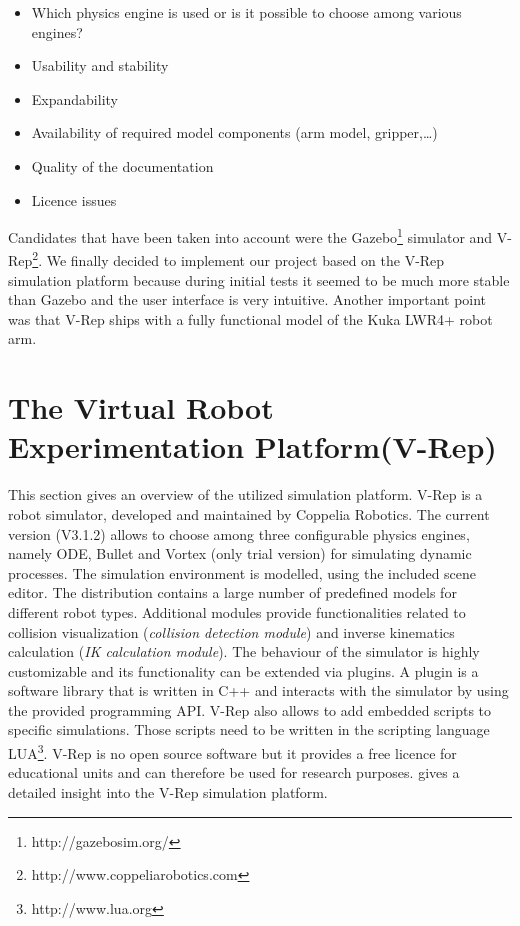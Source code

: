 \begin{itemize}
\item
Which physics engine is used or is it possible to choose among various engines?
\item
Usability and stability
\item
Expandability
\item
Availability of required model components (arm model, gripper,\ldots)
\item
Quality of the documentation
\item
Licence issues
\end{itemize}

Candidates that have been taken into account were the Gazebo\footnote{http://gazebosim.org/} simulator and V-Rep\footnote{http://www.coppeliarobotics.com}. We finally decided to implement our project based on the V-Rep simulation platform because during initial tests it seemed to be much more stable than Gazebo and the user interface is very intuitive. Another important point was that V-Rep ships with a fully functional model of the Kuka LWR4+ robot arm.

\section{The Virtual Robot Experimentation Platform(V-Rep)}

This section gives an overview of the utilized simulation platform. V-Rep is a robot simulator, developed and maintained by Coppelia Robotics. The current version (V3.1.2) allows to choose among three configurable physics engines, namely ODE, Bullet and Vortex (only trial version) for simulating dynamic processes. The simulation environment is modelled, using the included scene editor. The distribution contains a large number of predefined models for different robot types. Additional modules provide functionalities related to collision visualization (\emph{collision detection module}) and inverse kinematics calculation (\emph{IK calculation module}). The behaviour of the simulator is highly customizable and its functionality can be extended via plugins. A plugin is a software library that is written in C++ and interacts with the simulator by using the provided programming API. V-Rep also allows to add embedded scripts to specific simulations. Those scripts need to be written in the scripting language LUA\footnote{http://www.lua.org}. V-Rep is no open source software but it provides a free licence for educational units and can therefore be used for research purposes. \cite{freese2013} gives a detailed insight into the V-Rep simulation platform.

